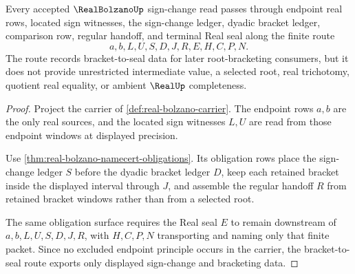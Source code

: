 
\begin{theorem}
\label{thm:real-bolzano-bracket-seal-route}
Every accepted $\RealBolzanoUp$ sign-change read passes through endpoint real rows, located sign witnesses, the sign-change ledger, dyadic bracket ledger, comparison row, regular handoff, and terminal Real seal along the finite route
$$
a,b,L,U,S,D,J,R,E,H,C,P,N .
$$
The route records bracket-to-seal data for later root-bracketing consumers, but it does not provide unrestricted intermediate value, a selected root, real trichotomy, quotient real equality, or ambient $\RealUp$ completeness.
\end{theorem}
\begin{proof}
Project the carrier of \autoref{def:real-bolzano-carrier}. The endpoint rows $a,b$ are the only real sources, and the located sign witnesses $L,U$ are read from those endpoint windows at displayed precision.

Use \autoref{thm:real-bolzano-namecert-obligations}. Its obligation rows place the sign-change ledger $S$ before the dyadic bracket ledger $D$, keep each retained bracket inside the displayed interval through $J$, and assemble the regular handoff $R$ from retained bracket windows rather than from a selected root.

The same obligation surface requires the Real seal $E$ to remain downstream of $a,b,L,U,S,D,J,R$, with $H,C,P,N$ transporting and naming only that finite packet. Since no excluded endpoint principle occurs in the carrier, the bracket-to-seal route exports only displayed sign-change and bracketing data.
\end{proof}

